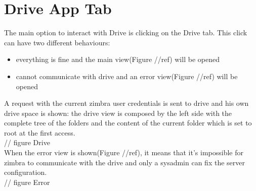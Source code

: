 \section{Drive App Tab}

The main option to interact with Drive is clicking on the Drive tab.
This click can have two different behaviours: 
\begin{itemize}
\item{everything is fine and the main view(Figure //ref) will be opened}
\item{cannot communicate with drive and an error view(Figure //ref) will be opened}
\end{itemize}

A request with the current zimbra user credentials is sent to drive and his own drive space is shown:
the drive view is composed by the left side with the complete tree of the folders 
and the content of the current folder which is set to root at the first access.\\
// figure Drive
\\

When the error view is shown(Figure //ref), it means that it's impossible for zimbra to communicate with the drive and
only a sysadmin can fix the server configuration.\\
// figure Error
\\

